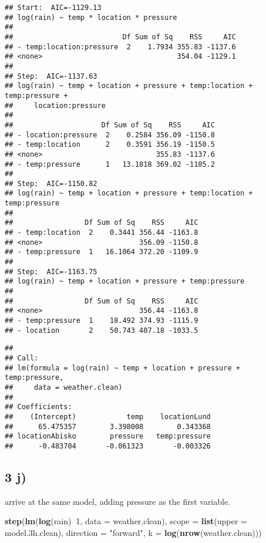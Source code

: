 \documentclass[]{article}
\newenvironment{Shaded}{\begin{snugshade}}{\end{snugshade}}
\newcommand{\DataTypeTok}[1]{\textcolor[rgb]{0.13,0.29,0.53}{#1}}
\newcommand{\DecValTok}[1]{\textcolor[rgb]{0.00,0.00,0.81}{#1}}
\newcommand{\FloatTok}[1]{\textcolor[rgb]{0.00,0.00,0.81}{#1}}
\newcommand{\KeywordTok}[1]{\textcolor[rgb]{0.13,0.29,0.53}{\textbf{#1}}}
\newcommand{\NormalTok}[1]{#1}
\newcommand{\OperatorTok}[1]{\textcolor[rgb]{0.81,0.36,0.00}{\textbf{#1}}}
\newcommand{\StringTok}[1]{\textcolor[rgb]{0.31,0.60,0.02}{#1}}
\begin{document}
\begin{verbatim}
## Start:  AIC=-1129.13
## log(rain) ~ temp * location * pressure
## 
##                          Df Sum of Sq    RSS     AIC
## - temp:location:pressure  2    1.7934 355.83 -1137.6
## <none>                                354.04 -1129.1
## 
## Step:  AIC=-1137.63
## log(rain) ~ temp + location + pressure + temp:location + temp:pressure + 
##     location:pressure
## 
##                     Df Sum of Sq    RSS     AIC
## - location:pressure  2    0.2584 356.09 -1150.8
## - temp:location      2    0.3591 356.19 -1150.5
## <none>                           355.83 -1137.6
## - temp:pressure      1   13.1818 369.02 -1105.2
## 
## Step:  AIC=-1150.82
## log(rain) ~ temp + location + pressure + temp:location + temp:pressure
## 
##                 Df Sum of Sq    RSS     AIC
## - temp:location  2    0.3441 356.44 -1163.8
## <none>                       356.09 -1150.8
## - temp:pressure  1   16.1064 372.20 -1109.9
## 
## Step:  AIC=-1163.75
## log(rain) ~ temp + location + pressure + temp:pressure
## 
##                 Df Sum of Sq    RSS     AIC
## <none>                       356.44 -1163.8
## - temp:pressure  1    18.492 374.93 -1115.9
## - location       2    50.743 407.18 -1033.5
\end{verbatim}

\begin{verbatim}
## 
## Call:
## lm(formula = log(rain) ~ temp + location + pressure + temp:pressure, 
##     data = weather.clean)
## 
## Coefficients:
##    (Intercept)            temp    locationLund  
##      65.475357        3.398008        0.343368  
## locationAbisko        pressure   temp:pressure  
##      -0.483704       -0.061323       -0.003326
\end{verbatim}

\hypertarget{j}{%
\subsection{3 j)}\label{j}}

arrive at the same model, adding pressure as the first variable.

\begin{Shaded}
\begin{Highlighting}[]
\KeywordTok{step}\NormalTok{(}\KeywordTok{lm}\NormalTok{(}\KeywordTok{log}\NormalTok{(rain)}\OperatorTok{~}\DecValTok{1}\NormalTok{, }\DataTypeTok{data =}\NormalTok{ weather.clean), }
     \DataTypeTok{scope =} \KeywordTok{list}\NormalTok{(}\DataTypeTok{upper =}\NormalTok{ model}\FloatTok{.3}\NormalTok{h.clean), }
     \DataTypeTok{direction =} \StringTok{"forward"}\NormalTok{, }\DataTypeTok{k =} \KeywordTok{log}\NormalTok{(}\KeywordTok{nrow}\NormalTok{(weather.clean)))}
\end{Highlighting}
\end{Shaded}
\end{document}
